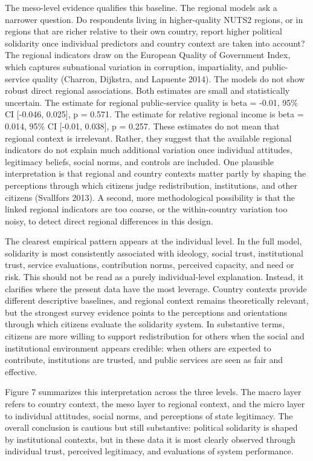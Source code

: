 \documentclass[12pt]{article}
\begin{document}
The meso-level evidence qualifies this baseline. The regional models ask
a narrower question. Do respondents living in higher-quality NUTS2
regions, or in regions that are richer relative to their own country,
report higher political solidarity once individual predictors and
country context are taken into account? The regional indicators draw on
the European Quality of Government Index, which captures subnational
variation in corruption, impartiality, and public-service quality
(Charron, Dijkstra, and Lapuente 2014). The models do not show robust
direct regional associations. Both estimates are small and statistically
uncertain. The estimate for regional public-service quality is beta =
-0.01, 95\% CI {[}-0.046, 0.025{]}, p = 0.571. The estimate for relative
regional income is beta = 0.014, 95\% CI {[}-0.01, 0.038{]}, p = 0.257.
These estimates do not mean that regional context is irrelevant. Rather,
they suggest that the available regional indicators do not explain much
additional variation once individual attitudes, legitimacy beliefs,
social norms, and controls are included. One plausible interpretation is
that regional and country contexts matter partly by shaping the
perceptions through which citizens judge redistribution, institutions,
and other citizens (Svallfors 2013). A second, more methodological
possibility is that the linked regional indicators are too coarse, or
the within-country variation too noisy, to detect direct regional
differences in this design.

The clearest empirical pattern appears at the individual level. In the
full model, solidarity is most consistently associated with ideology,
social trust, institutional trust, service evaluations, contribution
norms, perceived capacity, and need or risk. This should not be read as
a purely individual-level explanation. Instead, it clarifies where the
present data have the most leverage. Country contexts provide different
descriptive baselines, and regional context remains theoretically
relevant, but the strongest survey evidence points to the perceptions
and orientations through which citizens evaluate the solidarity system.
In substantive terms, citizens are more willing to support
redistribution for others when the social and institutional environment
appears credible: when others are expected to contribute, institutions
are trusted, and public services are seen as fair and effective.

Figure 7 summarizes this interpretation across the three levels. The
macro layer refers to country context, the meso layer to regional
context, and the micro layer to individual attitudes, social norms, and
perceptions of state legitimacy. The overall conclusion is cautious but
still substantive: political solidarity is shaped by institutional
contexts, but in these data it is most clearly observed through
individual trust, perceived legitimacy, and evaluations of system
performance.
\end{document}
